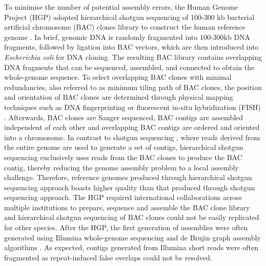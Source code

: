 To minimise the number of potential assembly errors, the Human Genome Project (HGP) adopted hierarchical shotgun sequencing of 100-300 kb bacterial artificial chromosome (BAC) clones library to construct the human reference genome \cite{Lander2001-du}. In brief, genomic DNA is randomly fragmented into 100-300kb DNA fragments, followed by ligation into BAC vectors, which are then introduced into \textit{Escherichia coli} for DNA cloning. The resulting BAC library contains overlapping DNA fragments that can be sequenced, assembled, and connected to obtain the whole-genome sequence. To select overlapping BAC clones with minimal redundancies, also referred to as minimum tiling path of BAC clones, the position and orientation of BAC clones are determined through physical mapping techniques such as DNA fingerprinting \cite{} or fluorescent in-situ hybridization (FISH) \cite{}. Afterwards, BAC clones are Sanger sequenced, BAC contigs are assembled independent of each other and overlapping BAC contigs are ordered and oriented into a chromosome. In contrast to shotgun sequencing \cite{}, where reads derived from the entire genome are used to generate a set of contigs, hierarchical shotgun sequencing exclusively uses reads from the BAC clones to produce the BAC contig, thereby reducing the genome assembly problem to a local assembly challenge. Therefore, reference genomes produced through hierarchical shotgun sequencing approach boasts higher quality than that produced through shotgun sequencing approach. The HGP required international collaborations across multiple institutions to prepare, sequence and assemble the BAC clone library and hierarchical shotgun sequencing of BAC clones could not be easily replicated for other species. After the HGP, the first generation of assemblies were often generated using Illumina whole-genome sequencing and de Brujin graph assembly algorithms \cite{}. As expected, contigs generated from Illumina short reads were often fragmented as repeat-induced false overlaps could not be resolved. 

